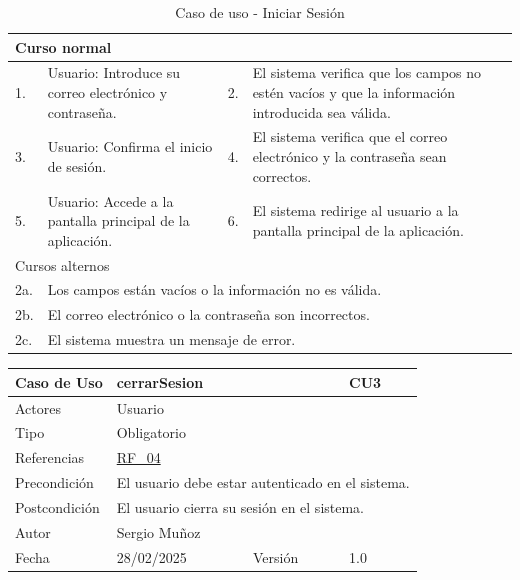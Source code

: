 \begin{table}[H]
    \centering
    \begin{tabular}{| m{} | m{} | m{} | m{} |}
        \hline
        \multicolumn{4}{|m{0.9\textwidth}|}{Curso normal}     \\ 
        \hline
        1. & Usuario: Introduce su correo electrónico y contraseña. 
        & 2. & El sistema verifica que los campos no estén vacíos y que la información introducida sea válida. \\ 
        \hline
        3. & Usuario: Confirma el inicio de sesión. & 4. & El sistema verifica que el correo electrónico y la contraseña sean correctos.   \\ 
        \hline
        5. & Usuario: Accede a la pantalla principal de la aplicación. & 6. & El sistema redirige al usuario a la pantalla principal de la aplicación. \\ 
        \hline
        \multicolumn{4}{|m{0.9\textwidth}|}{Cursos alternos}     \\
        \hline 
        2a. & \multicolumn{3}{l|}{Los campos están vacíos o la información no es válida.} \\ 
        \hline
        2b. & \multicolumn{3}{l|}{El correo electrónico o la contraseña son incorrectos.} \\ 
        \hline
        2c. & \multicolumn{3}{l|}{El sistema muestra un mensaje de error.} \\ 
        \hline
    \end{tabular}
    \caption{Caso de uso - Iniciar Sesión}
\end{table}

\newpage

\begin{table}[H]
    \centering
    \begin{tabular}{| m{} | m{} | m{} | m{} |}
        \hline
        \rowcolor[HTML]{C0C0C0} Caso de Uso & \multicolumn{2}{|m{0.43\textwidth}|}{cerrarSesion} &  CU3\\ 
        \hline
        Actores & \multicolumn{3}{l|}{Usuario} \\ 
        \hline
        Tipo & \multicolumn{3}{l|}{Obligatorio} \\ 
        \hline
        Referencias & \multicolumn{3}{l|}{\hyperref[req:RF04]{RF\_04}} \\ 
        \hline
        Precondición & \multicolumn{3}{l|}{El usuario debe estar autenticado en el sistema.} \\ 
        \hline
        Postcondición & \multicolumn{3}{l|}{El usuario cierra su sesión en el sistema.} \\ 
        \hline
        Autor & \multicolumn{3}{l|}{Sergio Muñoz} \\ 
        \hline
        Fecha & 28/02/2025 & Versión & 1.0 \\ 
        \hline
    \end{tabular}
\end{table}


